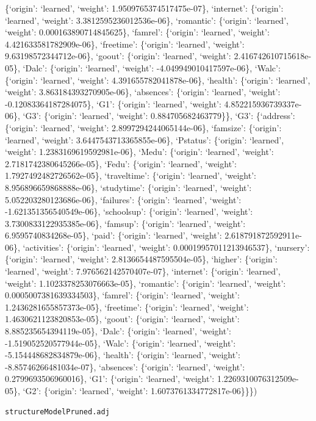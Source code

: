 \documentclass[
]{article}
\begin{document}
\{`origin': `learned', `weight': 1.9509765374517475e-07\}, `internet':
\{`origin': `learned', `weight': 3.3812595236012536e-06\}, `romantic':
\{`origin': `learned', `weight': 0.000163890714845625\}, `famrel':
\{`origin': `learned', `weight': 4.421633581782909e-06\}, `freetime':
\{`origin': `learned', `weight': 9.63198572344712e-06\}, `goout':
\{`origin': `learned', `weight': 2.416742610715618e-05\}, `Dalc':
\{`origin': `learned', `weight': -4.049949010417597e-06\}, `Walc':
\{`origin': `learned', `weight': 4.391655782041878e-06\}, `health':
\{`origin': `learned', `weight': 3.863184393270905e-06\}, `absences':
\{`origin': `learned', `weight': -0.12083364187284075\}, `G1':
\{`origin': `learned', `weight': 4.852215936739337e-06\}, `G3':
\{`origin': `learned', `weight': 0.884705682463779\}\}, `G3':
\{`address': \{`origin': `learned', `weight': 2.8997294244065144e-06\},
`famsize': \{`origin': `learned', `weight': 3.6447543713365855e-06\},
`Pstatus': \{`origin': `learned', `weight': 1.2383169619592981e-06\},
`Medu': \{`origin': `learned', `weight': 2.7181742380645266e-05\},
`Fedu': \{`origin': `learned', `weight': 1.7927492482726562e-05\},
`traveltime': \{`origin': `learned', `weight': 8.956896659868888e-06\},
`studytime': \{`origin': `learned', `weight': 5.052203280123686e-06\},
`failures': \{`origin': `learned', `weight': -1.621351356540549e-06\},
`schoolsup': \{`origin': `learned', `weight': 3.7300833122935385e-06\},
`famsup': \{`origin': `learned', `weight': 6.9595740834268e-05\},
`paid': \{`origin': `learned', `weight': 2.618791872592911e-06\},
`activities': \{`origin': `learned', `weight': 0.00019957011213946537\},
`nursery': \{`origin': `learned', `weight': 2.8136654487595504e-05\},
`higher': \{`origin': `learned', `weight': 7.976562142570407e-07\},
`internet': \{`origin': `learned', `weight': 1.1023378253076663e-05\},
`romantic': \{`origin': `learned', `weight': 0.0005007381639334503\},
`famrel': \{`origin': `learned', `weight': 1.2436281655857373e-05\},
`freetime': \{`origin': `learned', `weight': 1.4630621123820853e-05\},
`goout': \{`origin': `learned', `weight': 8.885235654394119e-05\},
`Dalc': \{`origin': `learned', `weight': -1.519052520577944e-05\},
`Walc': \{`origin': `learned', `weight': -5.154448682834879e-06\},
`health': \{`origin': `learned', `weight': -8.85746266481034e-07\},
`absences': \{`origin': `learned', `weight': 0.2799693506960016\}, `G1':
\{`origin': `learned', `weight': 1.2269310076312509e-05\}, `G2':
\{`origin': `learned', `weight': 1.6073761334772817e-06\}\}\})

\begin{verbatim}
structureModelPruned.adj
\end{verbatim}
\end{document}
